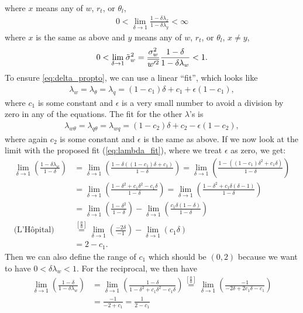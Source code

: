 where $x$ means any of $w$, $r_t$, or $\theta_l$,
\begin{align}
    0 < \lim_{\delta\to 1} \frac{1-\delta\lambda_x}{1-\delta\lambda_y} < \infty
\end{align}
where $x$ is the same as above and $y$ means any of $w$, $r_t$, or $\theta_l$, $x \neq y$,
\begin{align}
    0 < \lim_{\delta \to 1} {\tilde{\sigma}_w}^2 = \frac{\sigma_w^2}{\overline{w'^2}}
    \frac{1-\delta}{1-\delta \lambda_w} < 1.
\end{align}
To ensure \cref{eq:delta_propto}, we can use a linear \enquote{fit}, which looks like
\begin{align}
    \label{eq:lambda_fit}
    \lambda_w = \lambda_\theta = \lambda_q
    = (1 - c_1) \delta + c_1 + \epsilon (1 - c_1),
\end{align}
where $c_1$ is some constant and $\epsilon$ is a very small number to avoid a division by zero in any of the equations.
The fit for the other $\lambda$'s is
\begin{align}
    \label{eq:lambda_xy_fit}
    \lambda_{w\theta} = \lambda_{q\theta} = \lambda_{wq}
    = (1 - c_2) \delta + c_2 - \epsilon (1 - c_2),
\end{align}
where again $c_2$ is some constant and $\epsilon$ is the same as above.
If we now look at the limit with the proposed fit (\cref{eq:lambda_fit}), where we treat $\epsilon$ as zero, we get:
\begin{align}
    \lim_{\delta \to 1} \left(\frac{1 - \delta\lambda_w}{1 - \delta}\right)
    &= \lim_{\delta \to 1} \left(\frac{1 - \delta((1 - c_1) \delta + c_1)}{1 - \delta}\right)
    = \lim_{\delta \to 1} \left(\frac{1 - ((1 - c_1) \delta^2 + c_1\delta)}{1 - \delta}\right) \\
    &= \lim_{\delta \to 1} \left(\frac{1 - \delta^2 + c_1\delta^2 - c_1\delta}{1 - \delta}\right)
    = \lim_{\delta \to 1} \left(\frac{1 - \delta^2 + c_1\delta(\delta - 1)}{1 - \delta}\right) \\
    &= \lim_{\delta \to 1} \left(\frac{1 - \delta^2}{1 - \delta}\right)
    - \lim_{\delta \to 1} \left(\frac{c_1\delta(1 - \delta)}{1 - \delta}\right) \\
    \text{(L'Hôpital)}
    &\overset{\left[\frac{0}{0}\right]}{=} \lim_{\delta \to 1} \left(\frac{-2\delta}{-1}\right)
    - \lim_{\delta \to 1} \left(c_1\delta\right) \\
    &= 2 - c_1.
\end{align}
Then we can also define the range of $c_1$ which should be $(0, 2)$ because we want to have $0 < \delta\lambda_w < 1$.
For the reciprocal, we then have
\begin{align}
    \lim_{\delta \to 1} \left(\frac{1 - \delta}{1 - \delta\lambda_w}\right)
    &= \lim_{\delta \to 1} \left(\frac{1 - \delta}{1 - \delta^2 + c_1\delta^2 - c_1\delta}\right)
    \overset{\left[\frac{0}{0}\right]}{=} \lim_{\delta \to 1} \left(\frac{-1}{- 2\delta + 2c_1\delta - c_1}\right) \\
    &= \frac{-1}{-2 + c_1} = \frac{1}{2 - c_1}
\end{align}

